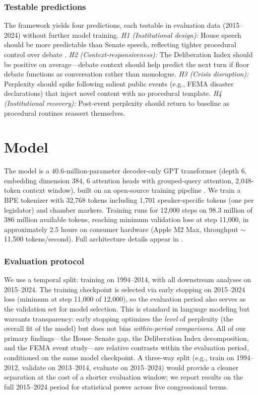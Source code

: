 \documentclass[12pt]{article}
\begin{document}
\subsubsection*{Testable predictions}
The framework yields four predictions, each testable in evaluation data (2015--2024) without further model training. \textit{H1 (Institutional design):} House speech should be more predictable than Senate speech, reflecting tighter procedural control over debate \citep{perssonTabellini2003}. \textit{H2 (Context-responsiveness):} The Deliberation Index should be positive on average---debate context should help predict the next turn if floor debate functions as conversation rather than monologue. \textit{H3 (Crisis disruption):} Perplexity should spike following salient public events (e.g., FEMA disaster declarations) that inject novel content with no procedural template. \textit{H4 (Institutional recovery):} Post-event perplexity should return to baseline as procedural routines reassert themselves.


\section{Model}
\label{sec:model}

The model is a 40.6-million-parameter decoder-only GPT transformer (depth 6, embedding dimension 384, 6 attention heads with grouped-query attention, 2,048-token context window), built on an open-source training pipeline \citep{karpathy2025}. We train a BPE tokenizer with 32,768 tokens including 1,701 speaker-specific tokens (one per legislator) and chamber markers. Training runs for 12,000 steps on 98.3 million of 386 million available tokens, reaching minimum validation loss at step 11,000, in approximately 2.5 hours on consumer hardware (Apple M2 Max, throughput $\sim$11,500 tokens/second). Full architecture details appear in .

\subsubsection*{Evaluation protocol} We use a temporal split: training on 1994--2014, with all downstream analyses on 2015--2024. The training checkpoint is selected via early stopping on 2015--2024 loss (minimum at step 11,000 of 12,000), so the evaluation period also serves as the validation set for model selection. This is standard in language modeling but warrants transparency: early stopping optimizes the \textit{level} of perplexity (the overall fit of the model) but does not bias \textit{within-period comparisons}. All of our primary findings---the House--Senate gap, the Deliberation Index decomposition, and the FEMA event study---are relative contrasts within the evaluation period, conditioned on the same model checkpoint. A three-way split (e.g., train on 1994--2012, validate on 2013--2014, evaluate on 2015--2024) would provide a cleaner separation at the cost of a shorter evaluation window; we report results on the full 2015--2024 period for statistical power across five congressional terms.
\end{document}
